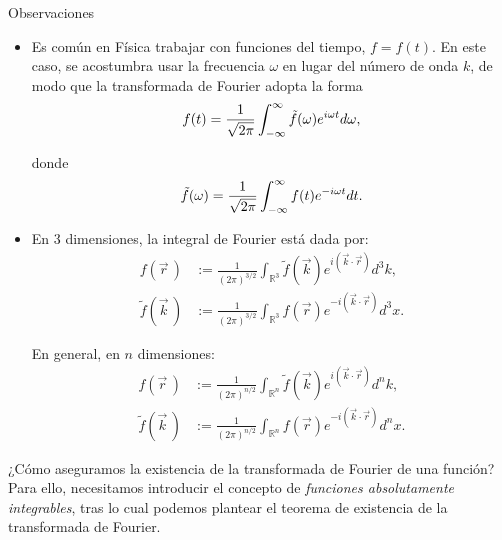 \begin{obs}{Observaciones}
\begin{itemize}
        
        \item Es común en Física trabajar con funciones del tiempo, $f = f(t)$. En este caso, se acostumbra usar la frecuencia $\omega$ en lugar del número de onda $k$, de modo que la transformada de Fourier adopta la forma
        $$
        f(t) = \frac{1}{\sqrt{2\pi}} \int_{- \infty}^{\infty} \Tilde{f}(\omega) e^{i \omega t} d\omega,
        $$
    
        donde
        $$
        \Tilde{f}(\omega) = \frac{1}{\sqrt{2\pi}} \int_{- \infty}^{\infty} f(t) e^{- i \omega t} dt.
        $$
        
        \item En 3 dimensiones, la integral de Fourier está dada por:
        \begin{align*}
             f(\vec{r}\,) &:= \frac{1}{(2\pi)^{3/2}} \int_{\mathbb{R}^3} \tilde{f}(\vec{k}) e^{i (\vec{k} \cdot \vec{r})} d^3k, \\
             \tilde{f}(\vec{k}\,) &:= \frac{1}{(2\pi)^{3/2}} \int_{\mathbb{R}^3} f(\vec{r}) e^{-i (\vec{k} \cdot \vec{r})} d^3x.
        \end{align*}
        
        En general, en $n$ dimensiones:
         \begin{align*}
             f(\vec{r}\,) &:= \frac{1}{(2\pi)^{n/2}} \int_{\mathbb{R}^n} \tilde{f}(\vec{k}) e^{i (\vec{k} \cdot \vec{r})} d^n k, \\
             \tilde{f}(\vec{k}\,) &:= \frac{1}{(2\pi)^{n/2}} \int_{\mathbb{R}^n} f(\vec{r}) e^{-i (\vec{k} \cdot \vec{r})} d^n x.
        \end{align*}
       
    \end{itemize}    
\end{obs}



¿Cómo aseguramos la existencia de la transformada de Fourier de una función? Para ello, necesitamos introducir el concepto de \emph{funciones absolutamente integrables}, tras lo cual podemos plantear el teorema de existencia de la transformada de Fourier.

